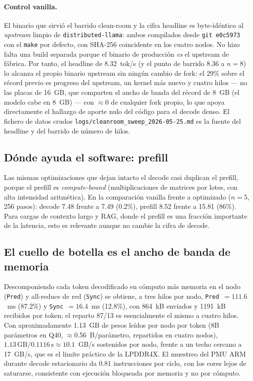 \documentclass[10pt,a4paper]{article}
\begin{document}
\paragraph{Control vanilla.} El binario que sirvió el barrido clean-room y la cifra headline es byte-idéntico al \emph{upstream} limpio de \texttt{distributed-llama}: ambos compilados desde \texttt{git}~\texttt{e0c5973} con el \texttt{make} por defecto, con SHA-256 coincidente en los cuatro nodos. No hizo falta una build separada porque el binario de producción \emph{es} el upstream de fábrica. Por tanto, el headline de 8.32~tok/s (y el punto de barrido 8.36 a $n{=}8$) lo alcanza el propio binario upstream sin ningún cambio de fork: el 29\% sobre el récord previo es progreso del upstream, un kernel más nuevo y cuatro hilos --- no las placas de 16~GB, que comparten el ancho de banda del récord de 8~GB (el modelo cabe en 8~GB) --- con $\approx$0 de cualquier fork propio, lo que apoya directamente el hallazgo de aporte nulo del código para el decode denso. El fichero de datos crudos \texttt{logs/cleanroom\_sweep\_2026-05-25.md} es la fuente del headline y del barrido de número de hilos.

\subsection{Dónde ayuda el software: prefill}
Las mismas optimizaciones que dejan intacto el decode casi duplican el prefill, porque el prefill es \emph{compute-bound} (multiplicaciones de matrices por lotes, con alta intensidad aritmética). En la comparación vanilla frente a optimizado ($n{=}5$, 256 pasos): decode 7.48 frente a 7.49 (0.2\%), prefill 8.52 frente a 15.81 (86\%). Para cargas de contexto largo y RAG, donde el prefill es una fracción importante de la latencia, esto es relevante aunque no cambie la cifra de decode.

\subsection{El cuello de botella es el ancho de banda de memoria}
\label{sec:bottleneck}
Descomponiendo cada token decodificado en cómputo más memoria en el nodo (\texttt{Pred}) y all-reduce de red (\texttt{Sync}) se obtiene, a tres hilos por nodo, \texttt{Pred}~$=111.6$~ms (87.2\%) y \texttt{Sync}~$=16.4$~ms (12.8\%), con 864~kB enviados y 1191~kB recibidos por token; el reparto 87/13 es esencialmente el mismo a cuatro hilos. Con aproximadamente 1.13~GB de pesos leídos por nodo por token (8B parámetros en Q40, $\approx$0.56~B/parámetro, repartidos en cuatro nodos), $1.13\,\text{GB}/0.1116\,\text{s}\approx 10.1$~GB/s sostenidos por nodo, frente a un techo cercano a 17~GB/s, que es el límite práctico de la LPDDR4X. El muestreo del PMU ARM durante decode estacionario da 0.81 instrucciones por ciclo, con los cores lejos de saturarse, consistente con ejecución bloqueada por memoria y no por cómputo.
\end{document}
